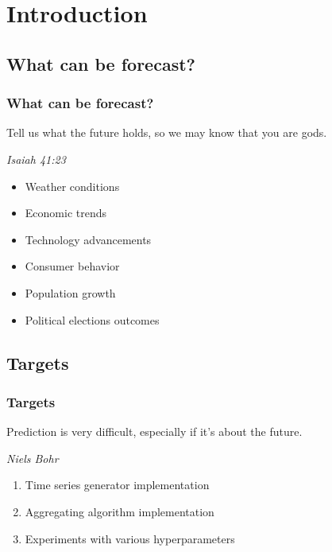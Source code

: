 \section{Introduction} %
\subsection{What can be forecast?} 

\begin{frame}
\frametitle{What can be forecast?}
\epigraph{Tell us what the future holds, so we may know that you are gods.}{\textit{Isaiah 41:23}}
%
\begin{itemize}
\item Weather conditions
\item Economic trends
\item Technology advancements
\item Consumer behavior
\item Population growth
\item Political elections outcomes

\end{itemize}
\end{frame}

\subsection{Targets} 

\begin{frame}
\frametitle{Targets}
\setlength{}
\epigraph{Prediction is very difficult, especially if it's about the future.}{\textit{Niels Bohr}}

\begin{enumerate}
\item Time series generator implementation
\item Aggregating algorithm implementation
\item Experiments with various hyperparameters    
\end{enumerate}


\end{frame}

